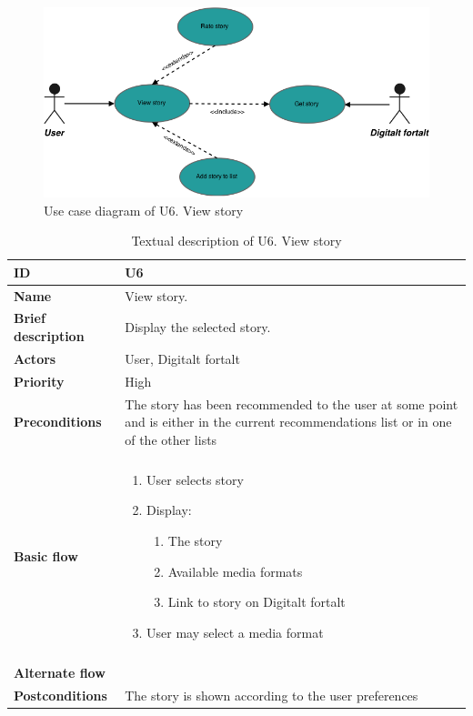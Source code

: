 \begin{figure}[hp]
	\includegraphics[width=\textwidth]{fig/U6}
	\centering
	\caption{Use case diagram of U6. View story}
	\label{Fig:U6}
\end{figure}

\begin{table}[hp]
	\renewcommand{\arraystretch}{1.5}
	\centering
	\caption{Textual description of U6. View story}
	\begin{tabular}[b]{|p{3.5cm} | p{13cm}|}\hline
		\textbf{ID} 				& U6									\\\hline
		\textbf{Name} 				& View story.							\\\hline
		\textbf{Brief description}	& Display the selected story. 		\\\hline
		\textbf{Actors} 			& User, Digitalt fortalt				\\\hline
		\textbf{Priority}			& High									\\\hline
		\textbf{Preconditions}		& The story has been recommended to the user at some point and is either in the current recommendations list or in one of the other lists			\\\hline&\\[-2ex]
		\textbf{Basic flow}			& \begin{minipage}{5in}
			\begin{enumerate}[noitemsep]
				\item User selects story
				\item Display:
					\begin{enumerate}
						\item The story
						\item Available media formats
						\item Link to story on Digitalt fortalt
					\end{enumerate}
				\item User may select a media format
			\end{enumerate}						
		\end{minipage}						\\\hline&\\[-2ex]
		\textbf{Alternate flow}		& \begin{minipage}{5in}
		\end{minipage}							\\\hline
		\textbf{Postconditions}		& The story is shown according to the user preferences\\\hline
	\end{tabular}
	\label{Tab:U6}
\end{table}

